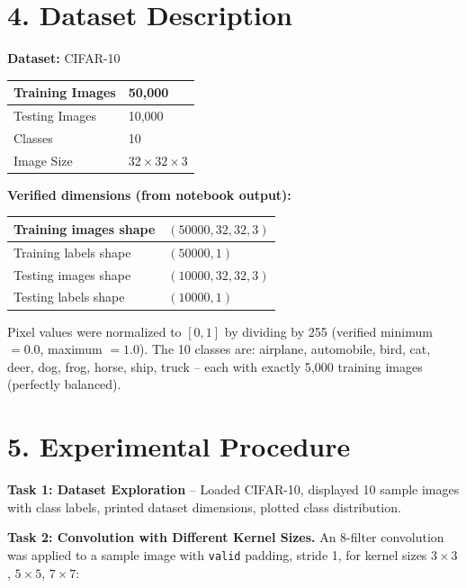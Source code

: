 \documentclass[11pt]{article}
\begin{document}
\section*{4. Dataset Description}

\textbf{Dataset:} CIFAR-10

\begin{center}
\begin{tabular}{|l|l|}
\hline
Training Images & 50{,}000 \\ \hline
Testing Images & 10{,}000 \\ \hline
Classes & 10 \\ \hline
Image Size & $32 \times 32 \times 3$ \\ \hline
\end{tabular}
\end{center}

\textbf{Verified dimensions (from notebook output):}
\begin{center}
\begin{tabular}{|l|l|}
\hline
Training images shape & $(50000, 32, 32, 3)$ \\ \hline
Training labels shape & $(50000, 1)$ \\ \hline
Testing images shape & $(10000, 32, 32, 3)$ \\ \hline
Testing labels shape & $(10000, 1)$ \\ \hline
\end{tabular}
\end{center}

Pixel values were normalized to $[0,1]$ by dividing by 255 (verified minimum $=0.0$, maximum $=1.0$). The 10 classes are: airplane, automobile, bird, cat, deer, dog, frog, horse, ship, truck -- each with exactly 5{,}000 training images (perfectly balanced).

\section*{5. Experimental Procedure}

\textbf{Task 1: Dataset Exploration} -- Loaded CIFAR-10, displayed 10 sample images with class labels, printed dataset dimensions, plotted class distribution.

\vspace{2mm}
\textbf{Task 2: Convolution with Different Kernel Sizes.} An 8-filter convolution was applied to a sample image with \texttt{valid} padding, stride 1, for kernel sizes $3\times3$, $5\times5$, $7\times7$:
\end{document}

